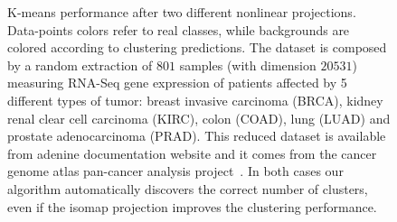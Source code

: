 \documentclass[twoside,11pt]{article}
\makeatletter
\newcommand{\ade}{{\sc adenine}\@\xspace}
\makeatother
\begin{document}
\begin{figure}[h!] 
    \centering
    \hfill%
\caption{\small K-means performance after two different nonlinear projections. Data-points colors refer to real classes, while backgrounds are colored according to clustering predictions. The dataset is composed by a random extraction of $801$ samples (with dimension $20531$) measuring RNA-Seq gene expression of patients affected by 5 different types of tumor: breast invasive carcinoma (BRCA), kidney renal clear cell carcinoma (KIRC), colon  (COAD), lung  (LUAD) and prostate adenocarcinoma (PRAD). This reduced dataset is available from \ade documentation website and it comes from the cancer genome atlas pan-cancer analysis project~\citep{weinstein2013cancer}. In both cases our algorithm automatically discovers the correct number of clusters, even if the isomap projection improves the clustering performance.} \label{fig:scatter}
\end{figure}



\newpage

\end{document}
